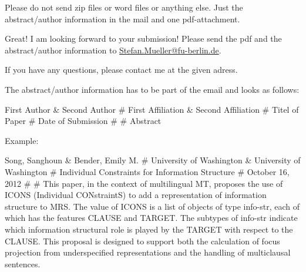 \documentclass[11pt,a4paper,fleqn]{article}
\begin{document}
Please do not send zip files
or word files or anything else. Just the abstract/author information in the mail and one pdf-attachment.



Great! I am looking forward to your submission!
Please send the pdf and the abstract/author information to\newline
\href{mailto:Stefan.Mueller@fu-berlin.de}{Stefan.Mueller@fu-berlin.de}. 


If you have any questions, please contact me at the given adress.

\newpage

\noindent
The abstract/author information has to be part of the email and looks as follows:

First Author \& Second Author \# First Affiliation \& Second Affiliation \# Titel of Paper \# Date of
Submission \# \# Abstract

\bigskip

Example:

\medskip
\noindent
Song, Sanghoun \& Bender, Emily M. \# University of Washington \& University of Washington \# Individual Constraints for Information Structure \# October 16, 2012 \# \#
This paper, in the context of multilingual MT, proposes the use of ICONS
(Individual CONstraintS) to add a representation of information structure to
MRS. The value of ICONS is a list of objects of type info-str, each of which
has the features CLAUSE and TARGET. The subtypes of info-str indicate
which information structural role is played by the TARGET with respect
to the CLAUSE. This proposal is designed to support both the calculation
of focus projection from underspecified representations and the handling of
multiclausal sentences.

\medskip



\end{document}
